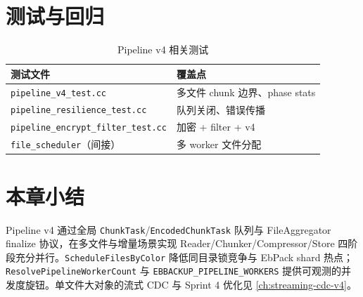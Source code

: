 \section{测试与回归}

\begin{table}[htbp]
\centering
\caption{Pipeline v4 相关测试}
\small
\begin{tabular}{@{}ll@{}}
\toprule
测试文件 & 覆盖点 \\
\midrule
\texttt{pipeline\_v4\_test.cc} & 多文件 chunk 边界、phase stats \\
\texttt{pipeline\_resilience\_test.cc} & 队列关闭、错误传播 \\
\texttt{pipeline\_encrypt\_filter\_test.cc} & 加密 + filter + v4 \\
\texttt{file\_scheduler}（间接） & 多 worker 文件分配 \\
\bottomrule
\end{tabular}
\end{table}

\section{本章小结}

Pipeline v4 通过全局 \texttt{ChunkTask}/\texttt{EncodedChunkTask} 队列与 FileAggregator finalize 协议，在多文件与增量场景实现 Reader/Chunker/Compressor/Store 四阶段充分并行。\texttt{ScheduleFilesByColor} 降低同目录锁竞争与 EbPack shard 热点；\texttt{ResolvePipelineWorkerCount} 与 \texttt{EBBACKUP\_PIPELINE\_WORKERS} 提供可观测的并发度旋钮。单文件大对象的流式 CDC 与 Sprint 4 优化见 \cref{ch:streaming-cdc-v4}。
